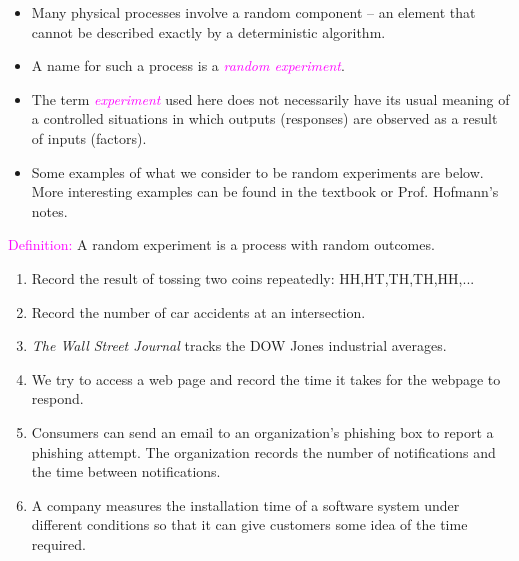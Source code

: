 \documentclass[20pt,landscape]{foils}
\newcommand{\no}{\noindent}
\newcommand{\bi}{\begin{itemize}}
\newcommand{\ei}{\end{itemize}}
\newcommand{\be}{\begin{enumerate}}
\newcommand{\ee}{\end{enumerate}}
\newcommand{\bul}{\hspace*{.3in}{\textcolor{red}{$\bullet$ \ }}}
\begin{document}
\foilhead[-.5in]{\textcolor{blue}{Probabilistic Models for ``Real-World'' Processes}}
\bi
\item[\bul] Many physical processes involve a random component -- an element that cannot be described exactly by a deterministic algorithm.
\item[\bul] A name for such a process is a \textcolor{magenta}{\textit{random experiment}}.
\item[\bul] The term \textcolor{magenta}{\textit{experiment}} used here does not necessarily have its usual meaning of a controlled situations  in which outputs (responses) are observed as a result of inputs (factors).
\item[\bul] Some examples of what we consider to be random experiments are below.  More interesting examples can be found in the textbook or Prof. Hofmann's notes.
\ei
\foilhead[-.8in]{\textcolor{blue}{Examples of Random Experiments}}
\no \textcolor{magenta}{Definition:} A random experiment is a process with random outcomes.
\be
\addtolength{\itemsep}{-0.6\baselineskip}
\item[\bul] Record the result of tossing two coins repeatedly: HH,HT,TH,TH,HH,...
\item[\bul] Record the number of car accidents at an intersection. 
\item[\bul] \emph{The Wall Street Journal} tracks the DOW Jones industrial averages.
\item[\bul] We try to access a web page and record the time it takes for the webpage to respond.
\item[\bul] Consumers can send an email to an organization's phishing box to report a phishing attempt. The organization records the number of notifications and the time between notifications. 
\item[\bul] A company measures the installation time of a software system under different conditions so that it can give customers some idea of the time required.
\ee
\end{document}
